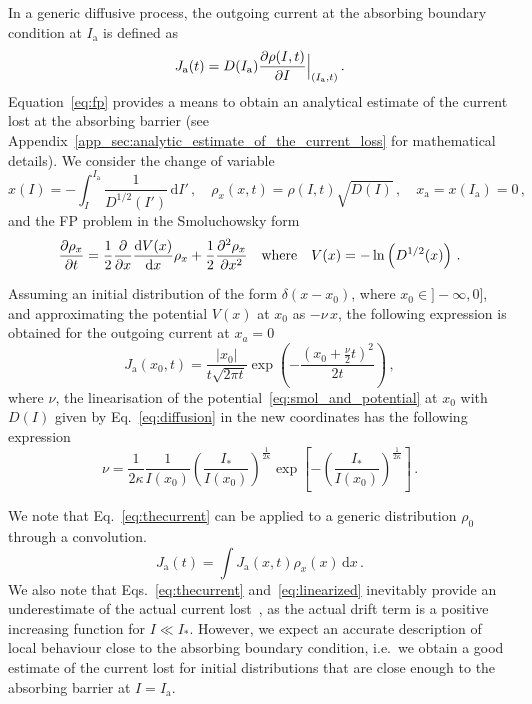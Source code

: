 {In a generic diffusive process, the outgoing current at the absorbing boundary condition at $I_\mathrm{a}$ is defined as
\begin{equation}
    J_\mathrm{a}(t) = D(I_\mathrm{a})\pdv{\rho(I, t)}{I} \Bigr|_{(I_\mathrm{a}, t)}\,.
    \label{eq:outgoing_current_definition}
\end{equation}
Equation~\eqref{eq:fp} provides a means to obtain an analytical estimate of the current lost at the absorbing barrier (see Appendix~\ref{app_sec:analytic_estimate_of_the_current_loss} for mathematical details). We consider the change of variable
\begin{equation}
    x(I) = -\int_I^{I_\mathrm{a}} \frac{1}{D^{1/2}(I')}\,\mathrm{d}I' \,, \quad \rho_x(x,t) = \rho(I, t) \sqrt{D(I)} \,, \quad x_\mathrm{a}=x(I_\mathrm{a})=0 \, ,
    \label{eq:change_of_variable}
\end{equation}
and the FP problem in the Smoluchowsky form
\begin{equation}
    \pdv{\rho_x}{t} = \frac{1}{2}\pdv{x} \dv{V(x)}{x} \rho_x+\frac{1}{2}\pdv[2]{\rho_x}{x} \quad \text{where} \quad V(x) = -\ln\left(D^{1/2}(x)\right) \, .
    \label{eq:smol_and_potential}
\end{equation}

Assuming an initial distribution of the form $\delta(x - x_0)$, where $x_0 \in ] -\infty, 0]$, and approximating the potential $V(x)$ at $x_0$ as $-\nu \, x$, the following expression is obtained for the outgoing current at $x_a = 0$
\begin{equation}
    J_\mathrm{a}(x_0, t) = \frac{|x_0|}{t\sqrt{2\pi t}}\exp\left(-\frac{(x_0+\frac{\nu}{2}t)^2}{2t}\right) \,,
    \label{eq:thecurrent}
\end{equation}
where $\nu$, the linearisation of the potential~\eqref{eq:smol_and_potential} at $x_0$ with $D(I)$ given by Eq.~\eqref{eq:diffusion} in the new coordinates has the following expression
\begin{equation}
    \nu=\frac{1}{2\kappa}\frac{1}{I(x_0)}\left(\frac{I_\ast}{I(x_0)}\right)^{\frac{1}{2\kappa}}\exp\left[-\left(\frac{I_\ast}{I(x_0)}\right)^{\frac{1}{2\kappa}}\right]\,.
    \label{eq:linearized}
\end{equation}

We note that Eq.~\eqref{eq:thecurrent} can be applied to a generic distribution $\rho_0$ through a convolution.
\begin{equation}
    J_\mathrm{a}(t) = \int J_\mathrm{a}(x,t)\rho_x(x)\,\mathrm{d}x\,.
    \label{eq:current_convolution}
\end{equation}
We also note that Eqs.~\eqref{eq:thecurrent} and~\eqref{eq:linearized} inevitably provide an underestimate of the actual current lost~\cite{montanari:ipac2021:tupab233}, as the actual drift term is a positive increasing function for $I\ll I_\ast$. However, we expect an accurate description of local behaviour close to the absorbing boundary condition, i.e.\ we obtain a good estimate of the current lost for initial distributions that are close enough to the absorbing barrier at $I=I_\mathrm{a}$. 

}
